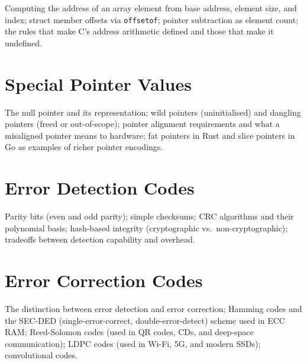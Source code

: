 Computing the address of an array element from base address, element size,
and index; struct member offsets via \texttt{offsetof}; pointer subtraction
as element count; the rules that make C's address arithmetic defined and
those that make it undefined.

\chapter{Special Pointer Values}
\label{ch:special-pointers}

The null pointer and its representation; wild pointers (uninitialised) and
dangling pointers (freed or out-of-scope); pointer alignment requirements
and what a misaligned pointer means to hardware; fat pointers in Rust and
slice pointers in Go as examples of richer pointer encodings.


%
%

\chapter{Error Detection Codes}
\label{ch:error-detection}

Parity bits (even and odd parity); simple checksums; CRC algorithms and
their polynomial basis; hash-based integrity (cryptographic vs.\
non-cryptographic); tradeoffs between detection capability and overhead.

\chapter{Error Correction Codes}
\label{ch:error-correction}

The distinction between error detection and error correction; Hamming codes
and the SEC-DED (single-error-correct, double-error-detect) scheme used in
ECC RAM; Reed-Solomon codes (used in QR codes, CDs, and deep-space
communication); LDPC codes (used in Wi-Fi, 5G, and modern SSDs);
convolutional codes.

